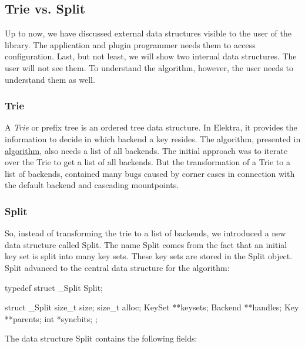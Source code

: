 \subsection*{Trie vs. Split}

Up to now, we have discussed external data structures visible to the user of the library. The application and plugin programmer needs them to access configuration. Last, but not least, we will show two internal data structures. The user will not see them. To understand the algorithm, however, the user needs to understand them as well.

\subsubsection*{Trie}

A {\itshape Trie} or prefix tree is an ordered tree data structure. In Elektra, it provides the information to decide in which backend a key resides. The algorithm, presented in \hyperlink{md_doc_help_elektra-algorithm_doc_help_elektra-algorithm_md}{algorithm}, also needs a list of all backends. The initial approach was to iterate over the {\ttfamily Trie} to get a list of all backends. But the transformation of a {\ttfamily Trie} to a list of backends, contained many bugs caused by corner cases in connection with the default backend and cascading mountpoints.

\subsubsection*{Split}

So, instead of transforming the trie to a list of backends, we introduced a new data structure called {\ttfamily Split}. The name {\ttfamily Split} comes from the fact that an initial key set is split into many key sets. These key sets are stored in the {\ttfamily Split} object. {\ttfamily Split} advanced to the central data structure for the algorithm\+: \begin{DoxyVerb}    typedef struct _Split   Split;

    struct _Split {
            size_t size;
            size_t alloc;
            KeySet **keysets;
            Backend **handles;
            Key **parents;
            int *syncbits;
    };
\end{DoxyVerb}


The data structure {\ttfamily Split} contains the following fields\+:


